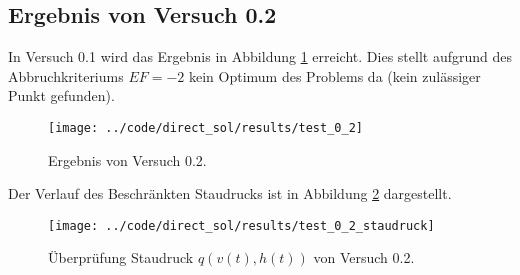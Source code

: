 \subsection{Ergebnis von Versuch 0.2}\label{kap:Versuch02}
In Versuch 0.1 wird das Ergebnis in Abbildung \ref{img:test_0_2} erreicht. Dies stellt aufgrund des Abbruchkriteriums $EF = -2$ kein Optimum des Problems da (kein zulässiger Punkt gefunden).
\begin{figure}[H]
\begin{center}
\texttt{[image: ../code/direct\_sol/results/test\_0\_2]}
\caption{Ergebnis von Versuch 0.2.}\label{img:test_0_2}
\end{center}
\end{figure}
Der Verlauf des Beschränkten Staudrucks ist in Abbildung \ref{img:test_0_2_staudruck} dargestellt.
\begin{figure}[H]
\begin{center}
\texttt{[image: ../code/direct\_sol/results/test\_0\_2\_staudruck]}
\caption{Überprüfung Staudruck $q(v(t),h(t))$ von Versuch 0.2.}\label{img:test_0_2_staudruck}
\end{center}
\end{figure}











\newpage
